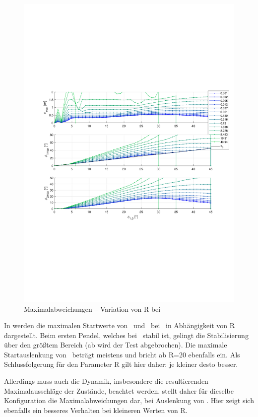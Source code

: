 \begin{figure}[htb]
	\centering
		\includegraphics[width=1\textwidth]{Bilder/QRVariation/ap2/R phi1 m.pdf}
	\caption{Maximalabweichungen -- Variation von R bei \apz}
	\label{fig:qrap2Rm}
\end{figure}

In  werden die maximalen Startwerte von \phe\ und \phz\ bei \apz\ in Abhängigkeit von R dargestellt.
Beim ersten Pendel, welches bei \apz\ stabil ist, gelingt die Stabilisierung über den größtem Bereich (ab  wird der Test abgebrochen).
Die maximale Startauslenkung von \phz\ beträgt meistens  und bricht ab R=20 ebenfalls ein.
Als Schlussfolgerung für den Parameter R gilt hier daher: je kleiner desto besser.

Allerdings muss auch die Dynamik, insbesondere die resultierenden Maximalausschläge der Zustände, beachtet werden.
 stellt daher für dieselbe Konfiguration die Maximalabweichungen dar, bei Auslenkung von \phe.
Hier zeigt sich ebenfalls ein besseres Verhalten bei kleineren Werten von R.

